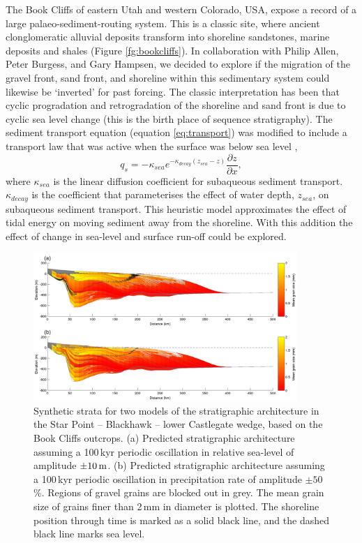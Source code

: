 The Book Cliffs of eastern Utah and western Colorado, USA, expose a record of a large palaeo-sediment-routing system. This is a classic site, where ancient clonglomeratic alluvial deposits transform into shoreline sandstones, marine deposits and shales (Figure \ref{fg:bookcliffs}). In collaboration with Philip Allen, Peter Burgess, and Gary Hampsen, we decided to explore if the migration of the gravel front, sand front, and shoreline within this sedimentary system could likewise be `inverted' for past forcing. The classic interpretation has been that cyclic progradation and retrogradation of the shoreline and sand front is due to cyclic sea level change (this is the birth place of sequence stratigraphy). The sediment transport equation (equation \ref{eq:transport}) was modified to include a transport law that was active when the surface was below sea level \citep{kaufman-etal-1991},
\begin{equation}
q_{s} = -\kappa_{sea}e^{-\kappa_{decay}\left(z_{sea}-z\right)}\frac{\partial z}{\partial x},
\end{equation}
where $\kappa_{sea}$ is the linear diffusion coefficient for subaqueous sediment transport. $\kappa_{decay}$ is the coefficient that parameterises the effect of water depth, $z_{sea}$, on subaqueous sediment transport. This heuristic model approximates the effect of tidal energy on moving sediment away from the shoreline. With this addition the effect of change in sea-level and surface run-off could be explored.

\begin{figure}
\centering
\includegraphics[width=10cm]{./figures/ch2-bookcliffs-model.pdf}
\caption{Synthetic strata for two models of the stratigraphic architecture in the Star Point -- Blackhawk -- lower Castlegate wedge, based on the Book Cliffs outcrops. (a) Predicted stratigraphic architecture assuming a 100\,kyr periodic oscillation in relative sea-level of amplitude $\pm 10\rm\,m$. (b) Predicted stratigraphic architecture assuming a 100\,kyr periodic oscillation in precipitation rate of amplitude $\pm 50$\,\%. Regions of gravel grains are blocked out in grey. The mean grain size of grains finer than 2\,mm in diameter is plotted. The shoreline position through time is marked as a solid black line, and the dashed black line marks sea level.}
\label{fg:bookcliffs-model}
\end{figure}

